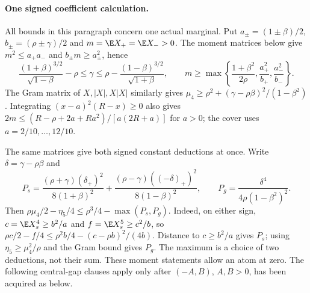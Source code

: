 \paragraph{One signed coefficient calculation.}
\label{j:local:atlas}\label{j:local:moments}
All bounds in this paragraph concern one actual marginal. Put
$a_\pm=(1\pm\beta)/2$, $b_\pm=(\rho\pm\gamma)/2$ and
$m=\E X_+=\E X_->0$. The moment matrices below give
$m^2\le a_+a_-$ and $b_\pm m\ge a_\pm^2$, hence
\[
 \frac{(1+\beta)^{3/2}}{\sqrt{1-\beta}}-\rho\le\gamma
 \le\rho-\frac{(1-\beta)^{3/2}}{\sqrt{1+\beta}},\qquad
 m\ge\max\left\{\frac{1+\beta^2}{2\rho},\frac{a_+^2}{b_+},\frac{a_-^2}{b_-}\right\}.
\]
The Gram matrix of $X,|X|,X|X|$ similarly gives
$\mu_4\ge\rho^2+(\gamma-\rho\beta)^2/(1-\beta^2)$.
Integrating $(x-a)^2(R-x)\ge0$ also gives
$2m\le(R-\rho+2a+Ra^2)/[a(2R+a)]$ for $a>0$; the cover uses
$a=2/10,\ldots,12/10$.

The same matrices give both signed constant deductions at once.
Write $\delta=\gamma-\rho\beta$ and
\[
 P_s=\frac{(\rho+\gamma)(\delta_+)^2}{8(1+\beta)^2}
       +\frac{(\rho-\gamma)((-\delta)_+)^2}{8(1-\beta)^2},\qquad
 P_g=\frac{\delta^4}{4\rho(1-\beta^2)^2}.
\]
Then $\rho\mu_4/2-\eta_5/4\le\rho^3/4-\max(P_s,P_g)$.
Indeed, on either sign, $c=\E X_s^4\ge b^2/a$ and
$f=\E X_s^5\ge c^2/b$, so
$\rho c/2-f/4\le\rho^2b/4-(c-\rho b)^2/(4b)$.
Distance to $c\ge b^2/a$ gives $P_s$; using
$\eta_5\ge\mu_4^2/\rho$ and the Gram bound gives $P_g$.
The maximum is a choice of two deductions, not their sum.
These moment statements allow an atom at zero. The following central-gap
clauses apply only after $(-A,B)$, $A,B>0$, has been acquired as below.
